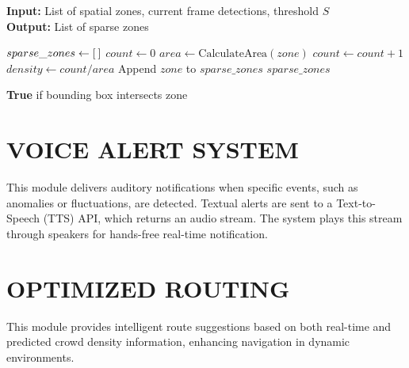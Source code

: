 \begin{algorithm}[H]
\caption{Sparse Zone Detection}
\label{alg:sparse_zone_detection}
\textbf{Input:} List of spatial zones, current frame detections, threshold $S$\\
\textbf{Output:} List of sparse zones
\begin{algorithmic}[1]
    \State $sparse\_zones \gets [\hspace{0.2em}]$
        \State $count \gets 0$
        \State $area \gets \text{CalculateArea}(zone)$
                \State $count \gets count + 1$
            \EndIf
        \EndFor
        \State $density \gets count / area$
            \State Append $zone$ to $sparse\_zones$
        \EndIf
    \EndFor
    \State \Return $sparse\_zones$
\EndFunction

    \State \Return \textbf{True} if bounding box intersects zone
\EndFunction
\end{algorithmic}
\end{algorithm}

\section{\MakeUppercase{Voice Alert System}}

This module delivers auditory notifications when specific events, such as anomalies or fluctuations, are detected. Textual alerts are sent to a Text-to-Speech (TTS) API, which returns an audio stream. The system plays this stream through speakers for hands-free real-time notification.

\section{\MakeUppercase{Optimized Routing}}

This module provides intelligent route suggestions based on both real-time and predicted crowd density information, enhancing navigation in dynamic environments.

